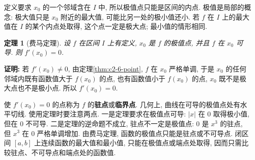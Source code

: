 \documentclass[UTF8,openany]{ctexbook}
\theoremstyle{chinesetextbook}
\newtheorem{theorem}{定理}[section]
\newenvironment{cnproof}{\par\indent\textbf{证明:} \ignorespaces}{\par}
\begin{document}
定义要求 $x_0$ 的一个邻域含在 $I$ 中, 所以极值点只能是区间的内点. 极值是局部的概念: 极大值只是 $x_0$ 附近的最大值, 可能比另一处的极小值还小. 若 $f$ 在 $I$ 上的最大值在 $I$ 的某个内点处取得, 这个点一定是极大点; 最小值的情形相同.
\begin{theorem}[费马定理]\label{thm:c2-6-fermat}
设 $f$ 在区间 $I$ 上有定义, $x_0$ 是 $f$ 的极值点, 并且 $f$ 在 $x_0$ 可导. 则 $f'(x_0)=0$.
\end{theorem}
\begin{cnproof}
若 $f'(x_0)\ne0$, 由定理\ref{thm:c2-6-point}, $f$ 在 $x_0$ 严格单调, 于是 $x_0$ 的任何邻域内既有函数值大于 $f(x_0)$ 的点, 也有函数值小于 $f(x_0)$ 的点, $x_0$ 既不是极大点也不是极小点. 所以 $f'(x_0)=0$.
\end{cnproof}
使 $f'(x_0)=0$ 的点称为 $f$ 的\textbf{驻点}或\textbf{临界点}. 几何上, 曲线在可导的极值点处有水平切线. 使用定理时要注意两点. 一是定理要求在极值点可导: $|x|$ 在 $0$ 取得极小值, 但在 $0$ 不可导. 二是定理的逆命题不成立, 驻点不一定是极值点: $0$ 是 $x^3$ 的驻点, 但 $x^3$ 在 $0$ 严格单调增加. 由费马定理, 函数的极值点只能是驻点或不可导点. 闭区间 $[a,b]$ 上连续函数的最大值和最小值, 只能在极值点或端点处取得, 因而只需比较驻点、不可导点和端点处的函数值.
\end{document}
